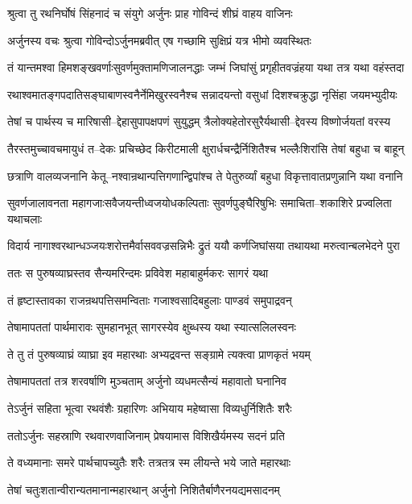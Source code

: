 \twolineshloka
{श्रुत्वा तु रथनिर्घोषं सिंहनादं च संयुगे}
{अर्जुनः प्राह गोविन्दं शीघ्रं वाहय वाजिनः}


\twolineshloka
{अर्जुनस्य वचः श्रुत्वा गोविन्दोऽर्जुनमब्रवीत्}
{एष गच्छामि सुक्षिप्रं यत्र भीमो व्यवस्थितः}


\twolineshloka
{तं यान्तमश्वा हिमशङ्खवर्णाःसुवर्णमुक्तामणिजालनद्धाः}
{जम्भं जिघांसुं प्रगृहीतवज्रंहया यथा तत्र यथा वहंस्तदा}


\twolineshloka
{रथाश्वमातङ्गपदातिसङ्घाबाणस्वनैर्नेमिखुरस्वनैश्च}
{सन्नादयन्तो वसुधां दिशश्चक्रुद्धा नृसिंहा जयमभ्युदीयः}


\twolineshloka
{तेषां च पार्थस्य च मारिषासी--द्देहासुपापक्षपणं सुयुद्धम्}
{त्रैलोक्यहेतोरसुरैर्यथासी--द्देवस्य विष्णोर्जयतां वरस्य}


\twolineshloka
{तैरस्तमुच्चावचमायुधं त--देकः प्रचिच्छेद किरीटमाली}
{क्षुरार्धचन्द्रैर्निशितैश्च भल्लैःशिरांसि तेषां बहुधा च बाहून्}


\twolineshloka
{छत्राणि वालव्यजनानि केतू--नश्वान्रथान्पत्तिगणान्द्विपांश्च}
{ते पेतुरुर्व्यां बहुधा विकृत्तावातप्रणुन्नानि यथा वनानि}


\twolineshloka
{सुवर्णजालावनता महागजाःसवैजयन्तीध्वजयोधकल्पिताः}
{सुवर्णपुङ्घैरिषुभिः समाचिता--शकाशिरे प्रज्वलिता यथाचलाः}


\twolineshloka
{विदार्य नागाश्वरथान्धञ्जयःशरोत्तमैर्वासववज्रसन्निभैः}
{द्रुतं ययौ कर्णजिघांसया तथायथा मरुत्वान्बलभेदने पुरा}


\twolineshloka
{ततः स पुरुषव्याघ्रस्तव सैन्यमरिन्दमः}
{प्रविवेश महाबाहुर्मकरः सागरं यथा}


\twolineshloka
{तं हृष्टास्तावका राजन्रथपत्तिसमन्विताः}
{गजाश्वसादिबहुलाः पाण्डवं समुपाद्रवन्}


\twolineshloka
{तेषामापततां पार्थमारावः सुमहानभूत्}
{सागरस्येव क्षुब्धस्य यथा स्यात्सलिलस्वनः}


\twolineshloka
{ते तु तं पुरुषव्याघ्रं व्याघ्रा इव महारथाः}
{अभ्यद्रवन्त सङ्ग्रामे त्यक्त्वा प्राणकृतं भयम्}


\twolineshloka
{तेषामापततां तत्र शरवर्षाणि मुञ्चताम्}
{अर्जुनो व्यधमत्सैन्यं महावातो घनानिव}


\twolineshloka
{तेऽर्जुनं सहिता भूत्वा रथवंशैः ग्रहारिणः}
{अभियाय महेष्वासा विव्यधुर्निशितैः शरैः}


\twolineshloka
{ततोऽर्जुनः सहस्राणि रथवारणवाजिनाम्}
{प्रेषयामास विशिखैर्यमस्य सदनं प्रति}


\twolineshloka
{ते वध्यमानाः समरे पार्थचापच्युतैः शरैः}
{तत्रतत्र स्म लीयन्ते भये जाते महारथाः}


\twolineshloka
{तेषां चतुःशतान्वीरान्यतमानान्महारथान्}
{अर्जुनो निशितैर्बाणैरनयद्यमसादनम्}


